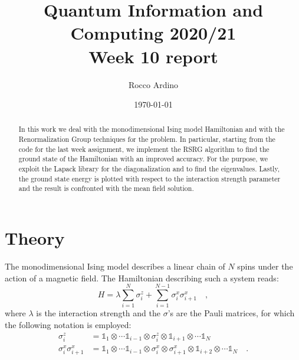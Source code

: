 \documentclass[pra, onecolumn, notitlepage, floats, 11pt]{revtex4-1}
\begin{document}
\title{Quantum Information and Computing 2020/21\\Week 10 report}

\author{Rocco Ardino}

\date{\today}





\begin{abstract}
    In this work we deal with the monodimensional Ising model Hamiltonian and with the Renormalization Group techniques for the problem. In particular, starting from the code for the last week assignment, we implement the RSRG algorithm to find the ground state of the Hamiltonian with an improved accuracy. For the purpose, we exploit the Lapack library for the diagonalization and to find the eigenvalues. Lastly, the ground state energy is plotted with respect to the interaction strength parameter and the result is confronted with the mean field solution.
\end{abstract}

\maketitle





\section{Theory}
The monodimensional Ising model describes a linear chain of \( N \) spins under the action of a magnetic field. The Hamiltonian describing such a system reads:
\begin{equation}
    H
    =
    \lambda \sum_{i=1}^{N} \sigma_{i}^{z} + \sum_{i=1}^{N-1} \sigma_{i}^{x} \sigma_{i+1}^{x}
    \quad ,
    \label{eq:10_T_1}
\end{equation}
where \( \lambda \) is the interaction strength and the \( \sigma \)'s are the Pauli matrices, for which the following notation is employed:
\begin{align}
    \sigma_{i}^{z}
    &=
        \mathbb{1}_{1} \otimes \cdots \mathbb{1}_{i-1} \otimes \sigma_{i}^{z} \otimes \mathbb{1}_{i+1} \otimes \cdots \mathbb{1}_{N}    \\
    \sigma_{i}^{x} \sigma_{i+1}^{x}
    &=
        \mathbb{1}_{1} \otimes \cdots \mathbb{1}_{i-1} \otimes \sigma_{i}^{x} \otimes \sigma_{i+1}^{x} \otimes \mathbb{1}_{i+2} \otimes \cdots \mathbb{1}_{N}
        \quad .
\end{align}
\end{document}
